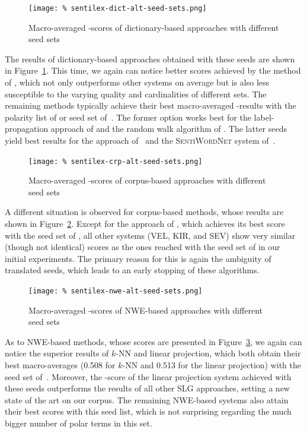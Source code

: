 \begin{figure}[hbtp]
  \centering
  \texttt{[image: \%
    sentilex-dict-alt-seed-sets.png]}
  \caption{Macro-averaged \F{}-scores of dictionary-based approaches
    with different seed sets}\label{snt:fig:sent-dict-lex-alt-seeds}
\end{figure}

The results of dictionary-based approaches obtained with these seeds
are shown in Figure~\ref{snt:fig:sent-dict-lex-alt-seeds}.  This time,
we again can notice better scores achieved by the method of
\citet{Blair-Goldensohn:08}, which not only outperforms other systems
on average but is also less susceptible to the varying quality and
cardinalities of different sets.  The remaining methods typically
achieve their best macro-averaged \F{}-results with the polarity list
of \citet{Kim:04} or seed set of~\citet{Esuli:06c}.  The former option
works best for the label-propagation approach of \citet{Rao:09} and
the random walk algorithm of \citet{Awadallah:10}.  The latter seeds
yield best results for the approach of~\citet{Hu:04} and the
\textsc{SentiWordNet} system of~\citet{Esuli:06c}.

\begin{figure}[hbtp]
  \centering
  \texttt{[image: \%
    sentilex-crp-alt-seed-sets.png]}
  \caption{Macro-averaged \F{}-scores of corpus-based approaches with
    different seed sets}\label{snt:fig:sent-crp-lex-alt-seeds}
\end{figure}

A different situation is observed for corpus-based methods, whose
results are shown in Figure~\ref{snt:fig:sent-crp-lex-alt-seeds}.
Except for the approach of \citet{Takamura:05}, which achieves its
best score with the seed set of \citet{Hu:04}, all other systems (VEL,
KIR, and SEV) show very similar (though not identical) scores as the
ones reached with the seed set of \citet{Turney:03} in our initial
experiments.  The primary reason for this is again the ambiguity of
translated seeds, which leads to an early stopping of these
algorithms.

\begin{figure}[hbtp]
  \centering
  \texttt{[image: \%
    sentilex-nwe-alt-seed-sets.png]}
  \caption{Macro-averaged \F{}-scores of NWE-based approaches with
    different seed sets}\label{snt:fig:sent-nwe-lex-alt-seeds}
\end{figure}

As to NWE-based methods, whose scores are presented in
Figure~\ref{snt:fig:sent-nwe-lex-alt-seeds}, we again can notice the
superior results of $k$-NN and linear projection, which both obtain
their best macro-averages (0.508 for $k$-NN and 0.513 for the linear
projection) with the seed set of~\citet{Kim:04}. Moreover, the
\F{}-score of the linear projection system achieved with these seeds
outperforms the results of all other SLG approaches, setting a new
state of the art on our corpus.  The remaining NWE-based systems also
attain their best scores with this seed list, which is not surprising
regarding the much bigger number of polar terms in this set.

